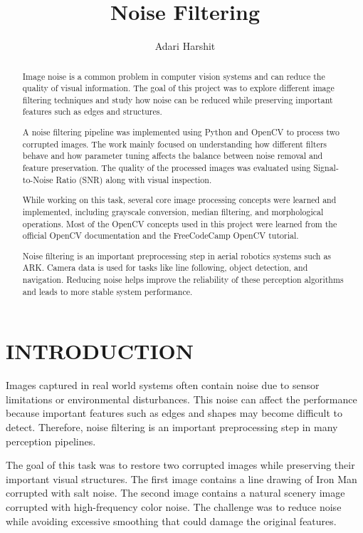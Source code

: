 \documentclass[letterpaper, 10 pt, conference]{ieeeconf}
\title{\LARGE \bf
Noise Filtering
}
\author{Adari Harshit}
\begin{document}
\maketitle\thispagestyle{empty}
\pagestyle{empty}

\begin{abstract}

Image noise is a common problem in computer vision systems and can reduce the quality of visual information. 
The goal of this project was to explore different image filtering techniques and 
study how noise can be reduced while preserving important features such as edges and structures.

A noise filtering pipeline was implemented using Python and OpenCV to process two corrupted images. 
The work mainly focused on understanding how different filters behave and 
how parameter tuning affects the balance between noise removal and feature preservation. 
The quality of the processed images was evaluated using Signal-to-Noise Ratio (SNR) along with visual inspection.

While working on this task, several core image processing concepts were learned and implemented, 
including grayscale conversion, median filtering, and morphological operations. 
Most of the OpenCV concepts used in this project were learned from the official OpenCV documentation and the FreeCodeCamp OpenCV tutorial.

Noise filtering is an important preprocessing step in aerial robotics systems such as ARK. 
Camera data is used for tasks like line following, object detection, and navigation. 
Reducing noise helps improve the reliability of these perception algorithms and leads to more stable system performance.

\end{abstract}


\section{INTRODUCTION}

Images captured in real world systems often contain noise due to sensor limitations or environmental disturbances. 
This noise can affect the performance because important features such as edges and shapes may become difficult to detect. 
Therefore, noise filtering is an important preprocessing step in many perception pipelines.

The goal of this task was to restore two corrupted images while preserving their important visual structures. 
The first image contains a line drawing of Iron Man corrupted with salt noise. 
The second image contains a natural scenery image corrupted with high-frequency color noise. 
The challenge was to reduce noise while avoiding excessive smoothing that could damage the original features.
\end{document}

